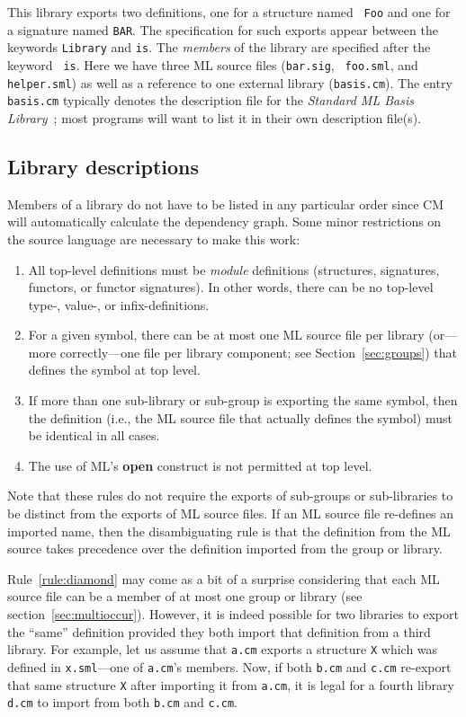 \documentclass{article}
\begin{document}
This library exports two definitions, one for a structure named {\tt
Foo} and one for a signature named {\tt BAR}.  The specification for
such exports appear between the keywords {\tt Library} and {\tt is}.
The {\em members} of the library are specified after the keyword {\tt
is}.  Here we have three ML source files ({\tt bar.sig}, {\tt
foo.sml}, and {\tt helper.sml}) as well as a reference to one external
library ({\tt basis.cm}).  The entry {\tt basis.cm} typically denotes
the description file for the {\it Standard ML Basis
Library}~\cite{reppy99:basis}; most programs will want to list it in
their own description file(s).

\subsection{Library descriptions}

Members of a library do not have to be listed in any particular order
since CM will automatically calculate the dependency graph.  Some
minor restrictions on the source language are necessary to make this
work:
\begin{enumerate}
\item All top-level definitions must be {\em module} definitions
(structures, signatures, functors, or functor signatures).  In other
words, there can be no top-level type-, value-, or infix-definitions.
\item For a given symbol, there can be at most one ML source file per
library (or---more correctly---one file per library component; see
Section~\ref{sec:groups}) that defines the symbol at top level.
\item If more than one sub-library or sub-group is exporting the same
symbol, then the definition (i.e., the ML source file that actually
defines the symbol) must be identical in all cases.
\label{rule:diamond}
\item The use of ML's {\bf open} construct is not permitted at top
level.
\end{enumerate}

Note that these rules do not require the exports of sub-groups or
sub-libraries to be distinct from the exports of ML source files.  If
an ML source file re-defines an imported name, then the disambiguating
rule is that the definition from the ML source takes precedence over
the definition imported from the group or library.

Rule~\ref{rule:diamond} may come as a bit of a surprise considering
that each ML source file can be a member of at most one group or
library (see section~\ref{sec:multioccur}).  However, it is indeed
possible for two libraries to export the ``same'' definition provided
they both import that definition from a third library.  For example,
let us assume that {\tt a.cm} exports a structure {\tt X} which was
defined in {\tt x.sml}---one of {\tt a.cm}'s members.  Now, if both
{\tt b.cm} and {\tt c.cm} re-export that same structure {\tt X} after
importing it from {\tt a.cm}, it is legal for a fourth library {\tt
d.cm} to import from both {\tt b.cm} and {\tt c.cm}.
\end{document}
